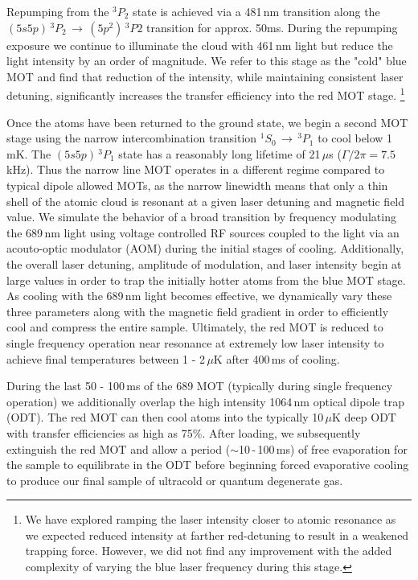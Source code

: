 Repumping from the $^3P_2$ state is achieved via a 481\,nm transition along the $(5s5p)\,^3P_2\,\rightarrow\,(5p^2)\,^3P2$ transition for approx. 50ms.
During the repumping exposure we continue to illuminate the cloud with 461\,nm light but reduce the light intensity by an order of magnitude.
We refer to this stage as the "cold" blue MOT and find that reduction of the intensity, while maintaining consistent laser detuning, significantly increases the transfer efficiency into the red MOT stage.
\footnote{We have explored ramping the laser intensity closer to atomic resonance as we expected reduced intensity at farther red-detuning to result in a weakened trapping force.
However, we did not find any improvement with the added complexity of varying the blue laser frequency during this stage.}

Once the atoms have been returned to the ground state, we begin a second MOT stage using the narrow intercombination transition $^1S_0\,\rightarrow\,^3P_1$ to cool below 1\,mK.
The $(5s5p)\,^3P_1$ state has a reasonably long lifetime of 21\,$\mu$s ($\Gamma/2\pi=7.5$ kHz).
Thus the narrow line MOT operates in a different regime compared to typical dipole allowed MOTs, as the narrow linewidth means that only a thin shell of the atomic cloud is resonant at a given laser detuning and magnetic field value.
We simulate the behavior of a broad transition by frequency modulating the 689\,nm light using voltage controlled RF sources coupled to the light via an acouto-optic modulator (AOM) during the initial stages of cooling.
Additionally, the overall laser detuning, amplitude of modulation, and laser intensity begin at large values in order to trap the initially hotter atoms from the blue MOT stage. 
As cooling with the 689\,nm light becomes effective, we dynamically vary these three parameters along with the magnetic field gradient in order to efficiently cool and compress the entire sample.
Ultimately, the red MOT is reduced to single frequency operation near resonance at extremely low laser intensity to achieve final temperatures between 1 - 2\,$\mu$K after 400\,ms of cooling.

During the last 50 - 100\,ms of the 689 MOT (typically during single frequency operation) we additionally overlap the high intensity 1064\,nm optical dipole trap (ODT).
The red MOT can then cool atoms into the typically 10\,$\mu$K deep ODT with transfer efficiencies as high as 75\%. 
After loading, we subsequently extinguish the red MOT and allow a period ($\sim$10\,-\,100\,ms) of free evaporation for the sample to equilibrate in the ODT before beginning forced evaporative cooling to produce our final sample of ultracold or quantum degenerate gas.

